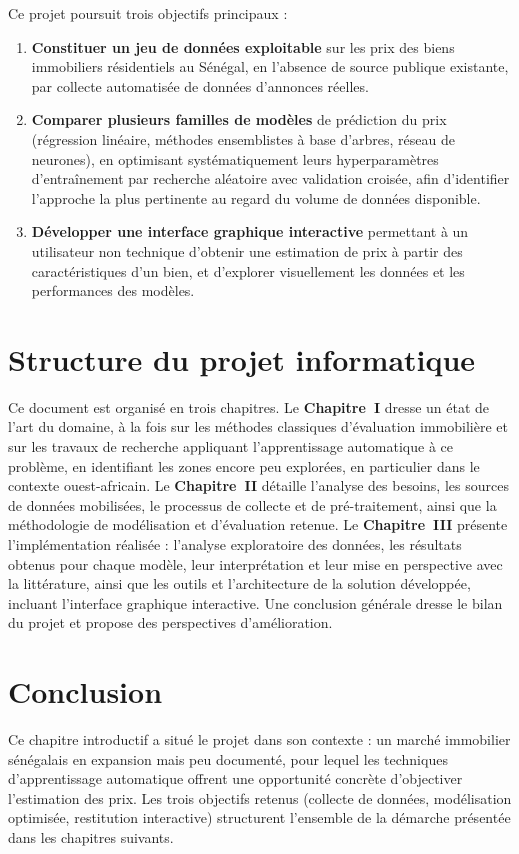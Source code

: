 Ce projet poursuit trois objectifs principaux :

\begin{enumerate}
  \item \textbf{Constituer un jeu de données exploitable} sur les prix des biens immobiliers
  résidentiels au Sénégal, en l'absence de source publique existante, par collecte automatisée
  de données d'annonces réelles.
  \item \textbf{Comparer plusieurs familles de modèles} de prédiction du prix (régression
  linéaire, méthodes ensemblistes à base d'arbres, réseau de neurones), en optimisant
  systématiquement leurs hyperparamètres d'entraînement par recherche aléatoire avec validation
  croisée, afin d'identifier l'approche la plus pertinente au regard du volume de données
  disponible.
  \item \textbf{Développer une interface graphique interactive} permettant à un utilisateur non
  technique d'obtenir une estimation de prix à partir des caractéristiques d'un bien, et
  d'explorer visuellement les données et les performances des modèles.
\end{enumerate}

\section{Structure du projet informatique}

Ce document est organisé en trois chapitres. Le \textbf{Chapitre~I} dresse un état de l'art du
domaine, à la fois sur les méthodes classiques d'évaluation immobilière et sur les travaux de
recherche appliquant l'apprentissage automatique à ce problème, en identifiant les zones encore
peu explorées, en particulier dans le contexte ouest-africain. Le \textbf{Chapitre~II} détaille
l'analyse des besoins, les sources de données mobilisées, le processus de collecte et de
pré-traitement, ainsi que la méthodologie de modélisation et d'évaluation retenue. Le
\textbf{Chapitre~III} présente l'implémentation réalisée : l'analyse exploratoire des données,
les résultats obtenus pour chaque modèle, leur interprétation et leur mise en perspective avec
la littérature, ainsi que les outils et l'architecture de la solution développée, incluant
l'interface graphique interactive. Une conclusion générale dresse le bilan du projet et propose
des perspectives d'amélioration.

\section{Conclusion}

Ce chapitre introductif a situé le projet dans son contexte : un marché immobilier sénégalais
en expansion mais peu documenté, pour lequel les techniques d'apprentissage automatique offrent
une opportunité concrète d'objectiver l'estimation des prix. Les trois objectifs retenus
(collecte de données, modélisation optimisée, restitution interactive) structurent l'ensemble
de la démarche présentée dans les chapitres suivants.
